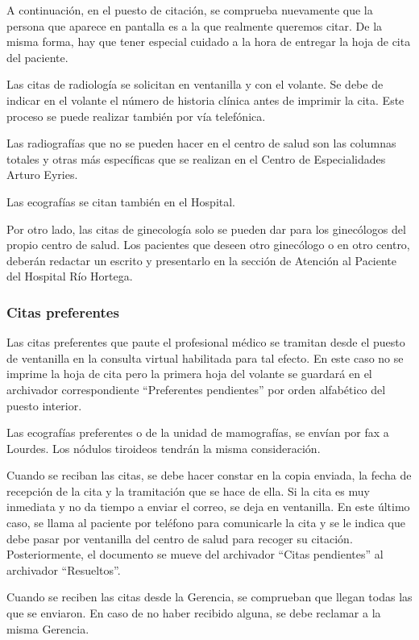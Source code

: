 A continuación, en el puesto de citación, se comprueba nuevamente que la persona que aparece en pantalla es a la que realmente queremos citar.
De la misma forma, hay que tener especial cuidado a la hora de entregar la hoja de cita del paciente.

Las citas de radiología se solicitan en ventanilla y con el volante.
Se debe de indicar en el volante el número de historia clínica antes de imprimir la cita.
Este proceso se puede realizar también por vía telefónica.

Las radiografías que no se pueden hacer en el centro de salud son las columnas totales y otras más específicas que se realizan en el Centro de Especialidades Arturo Eyries.

Las ecografías se citan también en el Hospital.

Por otro lado, las citas de ginecología solo se pueden dar para los ginecólogos del propio centro de salud.
Los pacientes que deseen otro ginecólogo o en otro centro, deberán redactar un escrito y presentarlo en la sección de Atención al Paciente del Hospital Río Hortega.

\subsubsection{Citas preferentes}

Las citas preferentes que paute el profesional médico se tramitan desde el puesto de ventanilla en la consulta virtual habilitada para tal efecto.
En este caso no se imprime la hoja de cita pero la primera hoja del volante se guardará en el archivador correspondiente ``Preferentes pendientes'' por orden alfabético del puesto interior.

Las ecografías preferentes o de la unidad de mamografías, se envían por fax a Lourdes. Los nódulos tiroideos tendrán la misma consideración.

Cuando se reciban las citas, se debe hacer constar en la copia enviada, la fecha de recepción de la cita y la tramitación que se hace de ella. Si la cita es muy inmediata y no da tiempo a enviar el correo, se deja en ventanilla.
En este último caso, se llama al paciente por teléfono para comunicarle la cita y se le indica que debe pasar por ventanilla del centro de salud para recoger su citación.
Posteriormente, el documento se mueve del archivador ``Citas pendientes'' al archivador ``Resueltos''.

Cuando se reciben las citas desde la Gerencia, se comprueban que llegan todas las que se enviaron. En caso de no haber recibido alguna, se debe reclamar a la misma Gerencia.

